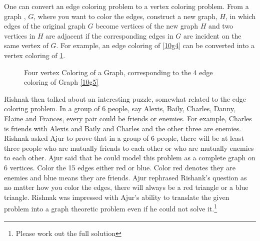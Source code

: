 One can convert an edge coloring problem to a vertex coloring problem. From a graph , $G$, where you want to color the edges, construct a new graph, $H$, in which edges of the original graph $G$ become vertices of the new graph $H$ and two vertices in $H$ are adjacent if the corresponding edges in $G$ are incident on the same vertex of $G$.
For example, an edge coloring of \ref{10g4} can be converted into a vertex coloring of \ref{10g45}.
\begin{figure}
\begin{center}


\caption{Four vertex Coloring of a Graph, corresponding to the 4 edge coloring of Graph \ref{10g5}}\label{10g45}
\end{center}
\end{figure}


Rishnak then talked about an interesting puzzle, somewhat related to the edge coloring problem. In a group of 6 people, say Alexis, Baily, Charles, Danny, Elaine and Frances, every pair could be friends or enemies. For example, Charles is friends with Alexis and Baily and Charles and the other three are enemies. Rishnak asked Ajur to prove that in a group of 6 people, there will be at least three people who are mutually friends to each other or who are mutually enemies to each other. Ajur said that he could model this problem as a complete graph on 6 vertices. Color the 15 edges either red or blue. Color red denotes they are enemies and blue means they are friends. Ajur rephrased Rishank's question as no matter how you color the edges, there will always be a red triangle or a blue triangle. Rishnak was impressed with Ajur's ability to translate the given problem into a graph theoretic problem even if he could not solve it.\footnote{Please work out the full solution}


